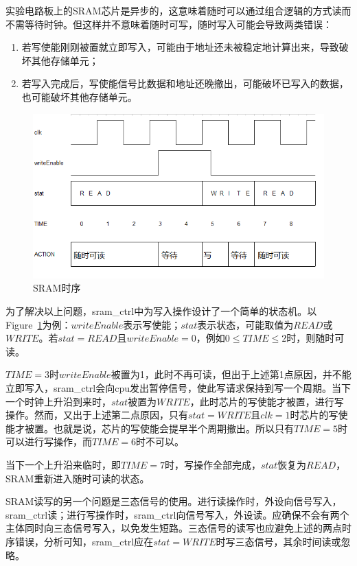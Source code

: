 \documentclass{article}
\begin{document}
\begin{spacing}{1.4}
实验电路板上的SRAM芯片是异步的，这意味着随时可以通过组合逻辑的方式读而不需等待时钟。但这样并不意味着随时可写，随时写入可能会导致两类错误：

\begin{enumerate}
    \item 若写使能刚刚被置就立即写入，可能由于地址还未被稳定地计算出来，导致破坏其他存储单元；
    \item 若写入完成后，写使能信号比数据和地址还晚撤出，可能破坏已写入的数据，也可能破坏其他存储单元。
\end{enumerate}

\begin{figure}[!htb]
	\centering
	\includegraphics[width=.8\textwidth]{sram-ctrl.png}
	\caption{SRAM时序}
    \label{fig:sram-ctrl}
\end{figure}

为了解决以上问题，sram\_ctrl中为写入操作设计了一个简单的状态机。以Figure~\ref{fig:sram-ctrl}为例：$writeEnable$表示写使能；$stat$表示状态，可能取值为$READ$或$WRITE$。若$stat=READ$且$writeEnable=0$，例如$0 \le TIME \le 2$时，则随时可读。

$TIME=3$时$writeEnable$被置为1，此时不再可读，但出于上述第1点原因，并不能立即写入，sram\_ctrl会向cpu发出暂停信号，使此写请求保持到写一个周期。当下一个时钟上升沿到来时，$stat$被置为$WRITE$，此时芯片的写使能才被置，进行写操作。然而，又出于上述第二点原因，只有$stat=WRITE$且$clk=1$时芯片的写使能才被置。也就是说，芯片的写使能会提早半个周期撤出。所以只有$TIME=5$时可以进行写操作，而$TIME=6$时不可以。

当下一个上升沿来临时，即$TIME=7$时，写操作全部完成，$stat$恢复为$READ$，SRAM重新进入随时可读的状态。

SRAM读写的另一个问题是三态信号的使用。进行读操作时，外设向信号写入，sram\_ctrl读；进行写操作时，sram\_ctrl向信号写入，外设读。应确保不会有两个主体同时向三态信号写入，以免发生短路。三态信号的读写也应避免上述的两点时序错误，分析可知，sram\_ctrl应在$stat=WRITE$时写三态信号，其余时间读或忽略。


\end{spacing}
\end{document}
